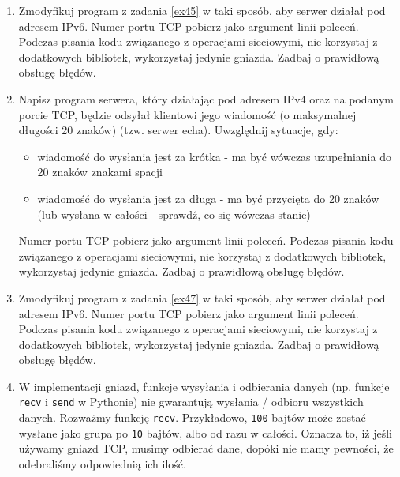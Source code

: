 \documentclass{article}
\begin{document}
\begin{enumerate}[label=\textbf{4.\arabic*}]
\item Zmodyfikuj program z zadania \ref{ex45} w taki sposób,  aby serwer działał pod adresem IPv6.   Numer portu TCP pobierz jako argument linii poleceń. Podczas pisania kodu związanego z operacjami sieciowymi, nie korzystaj z dodatkowych bibliotek, wykorzystaj jedynie gniazda. Zadbaj o prawidłową obsługę błędów.


\item \label{ex47} Napisz program serwera, który działając  pod adresem IPv4 oraz na podanym porcie TCP, będzie odsyłał klientowi jego wiadomość (o maksymalnej długości 20 znaków) (tzw. serwer echa).  Uwzględnij sytuacje, gdy:

\begin{itemize}
\item wiadomość do wysłania jest za krótka - ma być wówczas uzupełniania do 20 znaków znakami spacji
\item wiadomość do wysłania jest za długa - ma być przycięta do 20 znaków (lub wysłana w całości - sprawdź, co się wówczas stanie)
\end{itemize}

\noindent Numer portu TCP pobierz jako argument linii poleceń. Podczas pisania kodu związanego z operacjami sieciowymi, nie korzystaj z dodatkowych bibliotek, wykorzystaj jedynie gniazda. Zadbaj o prawidłową obsługę błędów.

\item Zmodyfikuj program z zadania \ref{ex47} w taki sposób,  aby serwer działał pod adresem IPv6.   Numer portu TCP pobierz jako argument linii poleceń. Podczas pisania kodu związanego z operacjami sieciowymi, nie korzystaj z dodatkowych bibliotek, wykorzystaj jedynie gniazda. Zadbaj o prawidłową obsługę błędów.


\item  \label{ex49} W implementacji gniazd, funkcje wysyłania i odbierania danych (np. funkcje \texttt{recv} i \texttt{send} w Pythonie) nie gwarantują wysłania / odbioru wszystkich danych. Rozważmy funkcję \texttt{recv}. Przykładowo, \texttt{100} bajtów może zostać wysłane jako grupa po \texttt{10} bajtów, albo od razu w całości. Oznacza to, iż jeśli używamy gniazd TCP, musimy odbierać dane, dopóki nie mamy pewności, że odebraliśmy odpowiednią ich ilość.


\end{enumerate}
\end{document}
